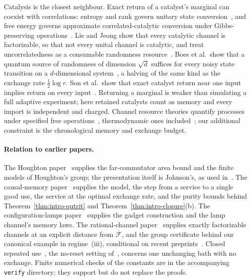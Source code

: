 Catalysis is the closest neighbour. Exact return of a catalyst's marginal
can coexist with correlations: entropy and rank govern unitary state
conversion~\cite{Wilming2022}, and free energy governs approximate
correlated-catalytic conversion under Gibbs-preserving
operations~\cite{ShiraishiSagawa2021}. Lie and Jeong show that every
catalytic channel is factorizable, so that not every unital channel is
catalytic, and treat uncorrelatedness as a consumable randomness
resource~\cite{LieJeong2021}. Boes et al.\ show that a quantum source of
randomness of dimension $\sqrt d$ suffices for every noisy state
transition on a $d$-dimensional system~\cite{BoesEtAl2018}, a halving of
the same kind as the exchange rate $\frac12\log r$. Son et al.\ show that
exact catalyst return near one input implies return on every
input~\cite{SonEtAl2026}. Returning a marginal is weaker than simulating
a full adaptive experiment; here retained catalysts count as memory and
every import is independent and charged. Channel resource theories
quantify processes under specified free
operations~\cite{GourWinter2019}, thermodynamic ones
included~\cite{FaistBertaBrandao2021}; our additional constraint is the
chronological memory and exchange budget.

\paragraph{Relation to earlier papers.}
The Houghton paper~\cite{DouglasMghirbiA} supplies the far-commutator
area bound and the finite models of Houghton's group; the presentation
itself is Johnson's, as used in~\cite[Section~4]{DouglasMghirbiB}. The
causal-memory paper~\cite{DouglasMghirbiB} supplies the model, the step
from a service to a single good use, the service at the optimal exchange
rate, and the purity bounds behind Theorem~\ref{thm:intro-qutrit} and
Theorem~\ref{thm:intro-closure}(b). The configuration-lamps
paper~\cite{DouglasMghirbiC} supplies the gadget construction and the
lamp channel's memory laws. The rational-channel
paper~\cite{MghirbiDouglasD} supplies exactly factorizable channels at an
explicit distance from $\overline{\mathcal F}$, and the group certificate
behind our canonical example in regime~(iii), conditional on recent
preprints~\cite{WangZhi2026,AlekseevLiuThom2026,Thom2026}. Closed repeated
use~\cite{DouglasClosedMemory}, the no-reset setting
of~\cite{RybarZiman2008}, concerns one unchanging bath with no exchange.
Finite numerical checks of the constants are in the accompanying
\texttt{verify} directory; they support but do not replace the proofs.

